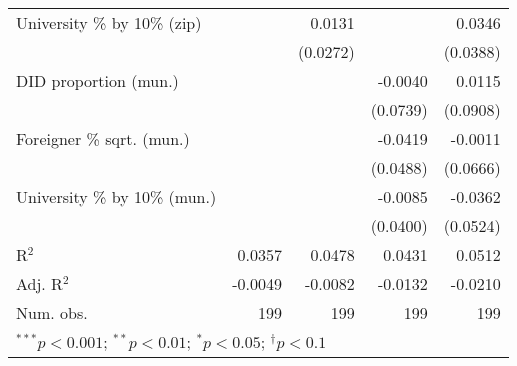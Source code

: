 \begin{tabular}{l D{.}{.}{3.5} D{.}{.}{3.5} D{.}{.}{3.5} D{.}{.}{3.5}}
University \% by 10\% (zip)       &          & 0.0131   &          & 0.0346   \\
                                  &          & (0.0272) &          & (0.0388) \\
DID proportion (mun.)             &          &          & -0.0040  & 0.0115   \\
                                  &          &          & (0.0739) & (0.0908) \\
Foreigner \% sqrt. (mun.)         &          &          & -0.0419  & -0.0011  \\
                                  &          &          & (0.0488) & (0.0666) \\
University \% by 10\% (mun.)      &          &          & -0.0085  & -0.0362  \\
                                  &          &          & (0.0400) & (0.0524) \\
\midrule
R$^2$                             & 0.0357   & 0.0478   & 0.0431   & 0.0512   \\
Adj. R$^2$                        & -0.0049  & -0.0082  & -0.0132  & -0.0210  \\
Num. obs.                         & 199      & 199      & 199      & 199      \\
\bottomrule
{}
\end{tabular}

